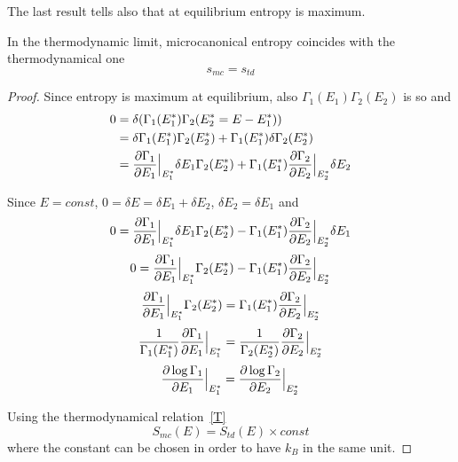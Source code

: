     The last result tells also that at equilibrium entropy is maximum.

    In the thermodynamic limit, microcanonical entropy coincides with the thermodynamical one 
    \begin{equation*}
        s_{mc} = s_{td}
    \end{equation*}

    \begin{proof}
        Since entropy is maximum at equilibrium, also $\Gamma_1(E_1) \Gamma_2(E_2)$ is so and
        \begin{equation*}
        \begin{aligned}
            0 & = \delta (\Gamma_1(E^*_1) \Gamma_2(E^*_2 = E - E^*_1)) \\ & = \delta \Gamma_1(E^*_1) \Gamma_2 (E^*_2) + \Gamma_1(E^*_1) \delta \Gamma_2 (E^*_2) \\ & = \frac{\partial\Gamma_1}{\partial E_1} \Big\vert_{E^*_1} \delta E_1 \Gamma_2 (E^*_2) + \Gamma_1(E^*_1) \frac{\partial\Gamma_2}{\partial E_2} \Big\vert_{E^*_2} \delta E_2 
        \end{aligned}
        \end{equation*}

        Since $E = const$, $0 = \delta E = \delta E_1 + \delta E_2$, $\delta E_2 = \delta E_1$ and
        \begin{equation*}
            0 = \frac{\partial\Gamma_1}{\partial E_1} \Big\vert_{E^*_1} \delta E_1 \Gamma_2 (E^*_2) - \Gamma_1(E^*_1) \frac{\partial\Gamma_2}{\partial E_2} \Big\vert_{E^*_2} \delta E_1 
        \end{equation*}
        \begin{equation*}
            0 = \frac{\partial\Gamma_1}{\partial E_1} \Big\vert_{E^*_1} \Gamma_2 (E^*_2) - \Gamma_1(E^*_1) \frac{\partial\Gamma_2}{\partial E_2} \Big\vert_{E^*_2} 
        \end{equation*}
        \begin{equation*}
            \frac{\partial\Gamma_1}{\partial E_1} \Big\vert_{E^*_1} \Gamma_2 (E^*_2) = \Gamma_1(E^*_1) \frac{\partial\Gamma_2}{\partial E_2} \Big\vert_{E^*_2} 
        \end{equation*}
        \begin{equation*}
            \frac{1}{\Gamma_1 (E^*_1)} \frac{\partial\Gamma_1}{\partial E_1} \Big\vert_{E^*_1} = \frac{1}{\Gamma_2 (E^*_2)} \frac{\partial\Gamma_2}{\partial E_2} \Big\vert_{E^*_2} 
        \end{equation*}
        \begin{equation*}
            \frac{\partial\log \Gamma_1}{\partial E_1} \Big\vert_{E^*_1} = \frac{\partial\log \Gamma_2}{\partial E_2} \Big\vert_{E^*_2} 
        \end{equation*}

        Using the thermodynamical relation~\eqref{T}
        \begin{equation*}
            S_{mc} (E) = S_{td} (E) \times const
        \end{equation*}
        where the constant can be chosen in order to have $k_B$ in the same unit.
    \end{proof}

